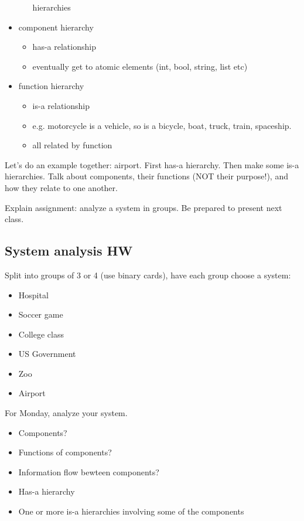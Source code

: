 \documentclass{article}
\begin{document}
\begin{itemize}
\begin{itemize}
    hierarchies
  \end{itemize}
\item component hierarchy
  \begin{itemize}
  \item has-a relationship
  \item eventually get to atomic elements (int, bool, string, list etc)
  \end{itemize}
\item function hierarchy
  \begin{itemize}
  \item is-a relationship
  \item e.g. motorcycle is a vehicle, so is a bicycle, boat, truck, train, spaceship.
  \item all related by function
  \end{itemize}
\end{itemize}

  Let's do an example together: airport.  First has-a hierarchy.  Then
  make some is-a hierarchies.  Talk about components, their functions
  (NOT their purpose!), and how they relate to one another.

  Explain assignment: analyze a system in groups.  Be prepared to
  present next class.

\subsection*{System analysis HW}

Split into groups of 3 or 4 (use binary cards), have each group choose
a system:

\begin{itemize}
\item Hospital
\item Soccer game
\item College class
\item US Government
\item Zoo
\item Airport
\end{itemize}

For Monday, analyze your system.
\begin{itemize}
\item Components?
\item Functions of components?
\item Information flow bewteen components?
\item Has-a hierarchy
\item One or more is-a hierarchies involving some of the components
\end{itemize}
\end{document}
